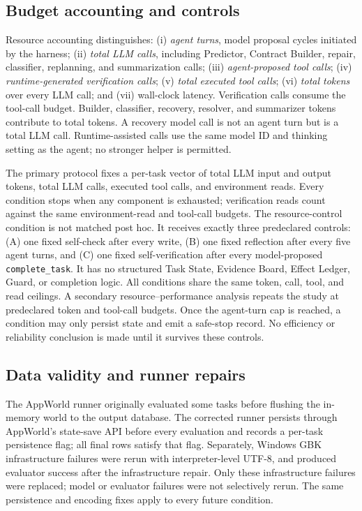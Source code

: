 \documentclass[10pt]{article}
\newcommand{\code}[1]{\texttt{#1}}
\begin{document}
\subsection{Budget accounting and controls}

Resource accounting distinguishes: (i) \emph{agent turns}, model proposal cycles
initiated by the harness; (ii) \emph{total LLM calls}, including Predictor,
Contract Builder, repair, classifier, replanning, and summarization calls;
(iii) \emph{agent-proposed tool calls}; (iv) \emph{runtime-generated verification
calls}; (v) \emph{total executed tool calls}; (vi) \emph{total tokens} over every
LLM call; and (vii) wall-clock latency. Verification calls consume the tool-call
budget. Builder, classifier, recovery, resolver, and summarizer tokens contribute
to total tokens. A recovery model call is not an agent turn but is a total LLM
call. Runtime-assisted calls use the same model ID and thinking setting as the
agent; no stronger helper is permitted.

The primary protocol fixes a per-task vector of total LLM input and
output tokens, total LLM calls, executed tool calls, and environment reads. Every
condition stops when any component is exhausted; verification reads count against
the same environment-read and tool-call budgets. The resource-control condition is
not matched post hoc. It receives exactly three predeclared controls: (A) one fixed
self-check after every write, (B) one fixed reflection after every five agent
turns, and (C) one fixed self-verification after every model-proposed
\code{complete\_task}. It has no structured Task State, Evidence Board, Effect
Ledger, Guard, or completion logic. All conditions share the same token, call,
tool, and read ceilings. A secondary resource--performance analysis repeats the
study at predeclared token and tool-call budgets. Once the \AWMaxTurns{} agent-turn cap is
reached, a condition may only persist state and emit a safe-stop record. No
efficiency or reliability conclusion is made until it survives these controls.

\subsection{Data validity and runner repairs}

The AppWorld runner originally evaluated some tasks before flushing the in-memory
world to the output database. The corrected runner persists through AppWorld's
state-save API before every evaluation and records a per-task persistence flag;
all \AWTaskCount{} final rows satisfy that flag. Separately,
\AWGBKRepairCount{} Windows GBK infrastructure failures were rerun with
interpreter-level UTF-8, and \AWGBKRepairSuccessCount{} produced evaluator success
after the infrastructure repair. Only these infrastructure failures were replaced;
model or evaluator failures were not selectively rerun. The same persistence and
encoding fixes apply to every future condition.
\end{document}
